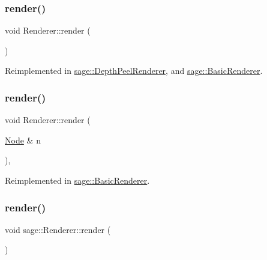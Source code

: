 \subsubsection{\texorpdfstring{render()}{render()}\hspace{0.1cm}{\footnotesize\ttfamily [1/3]}}
{\footnotesize\ttfamily void Renderer\+::render (\begin{DoxyParamCaption}{ }\end{DoxyParamCaption})\hspace{0.3cm}{\ttfamily [virtual]}}



Reimplemented in \mbox{\hyperlink{classsage_1_1DepthPeelRenderer_a84443362d98ad685cac1f2558c9445ee}{sage\+::\+Depth\+Peel\+Renderer}}, and \mbox{\hyperlink{classsage_1_1BasicRenderer_a127bbe33d8ef13fc64ff2e3943c0636b}{sage\+::\+Basic\+Renderer}}.

\mbox{\label{classsage_1_1Renderer_a213548aab22256923579dcfda01b12ba}} 
\subsubsection{\texorpdfstring{render()}{render()}\hspace{0.1cm}{\footnotesize\ttfamily [2/3]}}
{\footnotesize\ttfamily void Renderer\+::render (\begin{DoxyParamCaption}\item[{\mbox{\hyperlink{classsage_1_1Node}{Node}} \&}]{n }\end{DoxyParamCaption})\hspace{0.3cm}{\ttfamily [protected]}, {\ttfamily [virtual]}}



Reimplemented in \mbox{\hyperlink{classsage_1_1BasicRenderer_a098449e7b2b967968baaec113b53d653}{sage\+::\+Basic\+Renderer}}.

\mbox{\label{classsage_1_1Renderer_a26b3671c3df207eaf2620fdc06a2610e}} 
\subsubsection{\texorpdfstring{render()}{render()}\hspace{0.1cm}{\footnotesize\ttfamily [3/3]}}
{\footnotesize\ttfamily void sage\+::\+Renderer\+::render (\begin{DoxyParamCaption}{ }\end{DoxyParamCaption})\hspace{0.3cm}{\ttfamily [protected]}}

